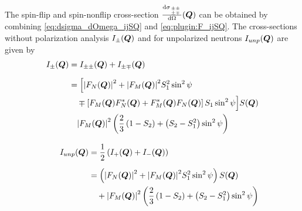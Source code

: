 The spin-flip and spin-nonflip cross-section
$\frac{\mathrm{d}\sigma_{{\pm\pm}\atop{\pm\mp}}}{\mathrm{d}\Omega}(\BM{Q})$
can be obtained by combining \ref{eq:dsigma_dOmega_ijSQ} and
\ref{eq:plugin:F_ijSQ}. The cross-sections without polarization
analysis $I_\pm(\BM{Q})$ and for unpolarized neutrons
$I_{unp}(\BM{Q})$ are given by
\begin{subequations} \label{eq:plugin:I_iSQ_I_unpSQ}
\begin{align}
\begin{split}
    I_{\pm}(\BM{Q}) &= I_{\pm\pm}(\BM{Q})+I_{\pm\mp}(\BM{Q}) \\[2mm]
                    &= \Bigl[\abs{F_N(\BM{Q})}^2 + \abs{F_M(\BM{Q})}^2S_1^2\sin^2\psi \\
                    & \quad  \mp \left[F_M(\BM{Q})F^*_N(\BM{Q})+F^*_M(\BM{Q})F_N(\BM{Q})\right]S_1\sin^2\psi\Bigr] S(\BM{Q}) \\
                    & \quad \abs{F_M(\BM{Q})}^2\left(\frac{2}{3}\left(1-S_2\right)+\left(S_2-S_1^2\right)\sin^2\psi \right)
\end{split} \\[3mm]
\begin{split}
    I_{unp}(\BM{Q}) &= \frac{1}{2}\left(I_{+}(\BM{Q})+I_{-}(\BM{Q})\right)\\[2mm]
                    &=  \left(\abs{F_N(\BM{Q})}^2 + \abs{F_M(\BM{Q})}^2S_1^2\sin^2\psi\right) S(\BM{Q}) \\
                    & \quad + \abs{F_M(\BM{Q})}^2\left(\frac{2}{3}\left(1-S_2\right)+\left(S_2-S_1^2\right)\sin^2\psi\right)
\end{split}
\end{align}
\end{subequations}


